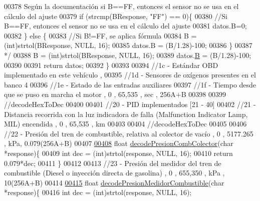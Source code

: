 \begin{DoxyCode}
{{{00378 \textcolor{comment}{    Según la documentación si B==FF, entonces el sensor no se usa en el cálculo del ajuste}
00379 \textcolor{comment}{    if (strcmp(BResponse, "FF") == 0)\{}
00380 \textcolor{comment}{        //Si B==FF, entonces el sensor no se usa en el cálculo del ajuste}
00381 \textcolor{comment}{        datos.B=0;}
00382 \textcolor{comment}{    \} else \{}
00383 \textcolor{comment}{        //Si B!=FF, se aplica fórmula}
00384 \textcolor{comment}{        B = (int)strtol(BResponse, NULL, 16);}
00385 \textcolor{comment}{        datos.B = (B/1.28)-100;}
00386 \textcolor{comment}{    \} }
00387 \textcolor{comment}{    */}
00388     B = (int)strtol(BResponse, NULL, 16);
00389     datos.\hyperlink{structOxigenoResponse_a96b19152dd001e19d1351e2d97f22736}{B} = (B/1.28)-100;
00390     
00391     \textcolor{keywordflow}{return} datos;
00392 \}
00393 
00394 \textcolor{comment}{//1c - Estándar OBD implementado en este vehículo , }
00395 \textcolor{comment}{//1d - Sensores de oxígenos presentes en el banco 4}
00396 \textcolor{comment}{//1e - Estado de las entradas auxiliares }
00397 \textcolor{comment}{//1f - Tiempo desde que se puso en marcha el motor , 0 , 65,535 , sec , 256A+B }
00398 
00399 \textcolor{comment}{//decodeHexToDec}
00400 
00401 \textcolor{comment}{//20 - PID implementados [21 - 40] }
00402 \textcolor{comment}{//21 - Distancia recorrida con la luz indicadora de falla (Malfunction Indicator Lamp, MIL) encendida , 0 ,
       65,535 , km}
00403 
00404 \textcolor{comment}{//decodeHexToDec}
00405 
00406 \textcolor{comment}{//22 - Presión del tren de combustible, relativa al colector de vacío , 0 , 5177.265 , kPa, 0.079(256A+B)}
00407 
\hyperlink{decoders_8hpp_a3e32aaf8ced989570e141f01210564f3}{00408} \textcolor{keywordtype}{float} \hyperlink{decoders_8cpp_a3e32aaf8ced989570e141f01210564f3}{decodePresionCombColector}(\textcolor{keywordtype}{char} *response)\{
00409     \textcolor{keywordtype}{int} dec = (int)strtol(response, NULL, 16);
00410     \textcolor{keywordflow}{return} 0.079*dec;
00411 \}
00412 
00413 \textcolor{comment}{//23 - Presión del medidor del tren de combustible (Diesel o inyección directa de gasolina) , 0 , 655,350 ,
       kPa , 10(256A+B) }
00414 
\hyperlink{decoders_8hpp_a228605d8cad0901a691ba4155a2326fc}{00415} \textcolor{keywordtype}{float} \hyperlink{decoders_8cpp_a228605d8cad0901a691ba4155a2326fc}{decodePresionMedidorCombustible}(\textcolor{keywordtype}{char} *response)\{
00416     \textcolor{keywordtype}{int} dec = (int)strtol(response, NULL, 16);
}}}
\end{DoxyCode}
